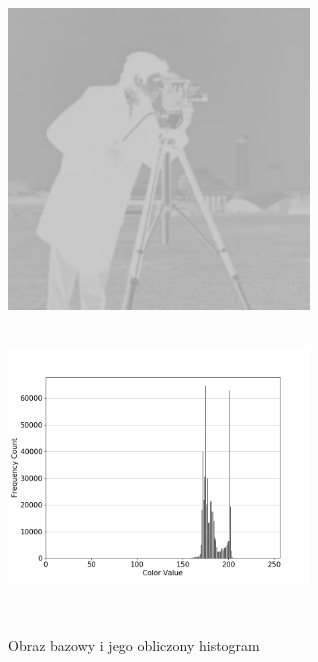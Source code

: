 \documentclass[a4paper,12pt]{book}
\begin{document}
\begin{figure}[H]
	\label{fig:man-bright-extend-histogram}
	\caption{Obraz bazowy i jego obliczony histogram}
	\includegraphics[width=8cm, height=8cm]{man-bright-unmodified.png}
	\includegraphics[width=8cm, height=8cm]{5-1/calculate-photoman-bright.png}
	

\end{figure}
\end{document}
